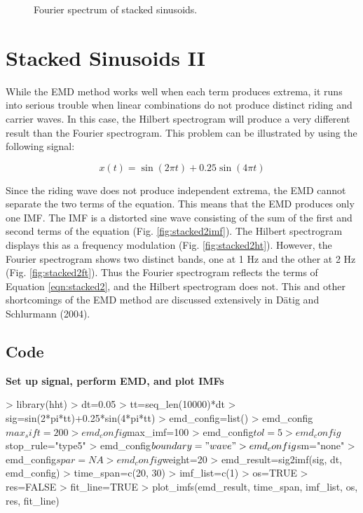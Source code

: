 \documentclass[12pt]{article}
\begin{document}
\begin{figure}[h]
\begin{center}
\end{center}
\caption{Fourier spectrum of stacked sinusoids.}
\label{fig:stacked1ft}
\end{figure}

\FloatBarrier

\section{Stacked Sinusoids II}

While the EMD method works well when each term produces extrema, it runs into serious trouble when linear combinations do not produce distinct riding and carrier waves.
In this case, the Hilbert spectrogram will produce a very different result than the Fourier spectrogram.
This problem can be illustrated by using the following signal:

\begin{equation}
\label{eqn:stacked2}
x(t) = \sin(2 \pi t) + 0.25\sin(4 \pi t)
\end{equation}

Since the riding wave does not produce independent extrema, the EMD cannot separate the two terms of the equation.
This means that the EMD produces only one IMF.
The IMF is a distorted sine wave consisting of the sum of the first and second terms of the equation (Fig. \ref{fig:stacked2imf}).
The Hilbert spectrogram displays this as a frequency modulation (Fig. \ref{fig:stacked2ht}).
However, the Fourier spectrogram shows two distinct bands, one at 1 Hz and the other at 2 Hz (Fig. \ref{fig:stacked2ft}).
Thus the Fourier spectrogram reflects the terms of Equation \ref{eqn:stacked2}, and the Hilbert spectrogram does not.
This and other shortcomings of the EMD method are discussed extensively in D\"{a}tig and Schlurmann (2004).

\subsection{Code}

\textbf{Set up signal, perform EMD, and plot IMFs}
\begin{Schunk}
\begin{Sinput}
> library(hht)
> dt=0.05
> tt=seq_len(10000)*dt
> sig=sin(2*pi*tt)+0.25*sin(4*pi*tt)
> emd_config=list()
> emd_config$max_sift=200
> emd_config$max_imf=100
> emd_config$tol=5
> emd_config$stop_rule="type5"
> emd_config$boundary="wave"
> emd_config$sm="none"
> emd_config$spar=NA
> emd_config$weight=20
> emd_result=sig2imf(sig, dt, emd_config)
> time_span=c(20, 30)
> imf_list=c(1)
> os=TRUE
> res=FALSE
> fit_line=TRUE
> plot_imfs(emd_result, time_span, imf_list, os, res, fit_line)
\end{Sinput}
\end{Schunk}
\end{document}
